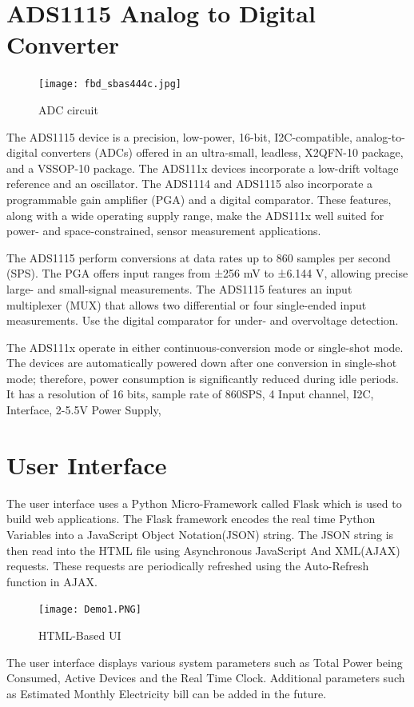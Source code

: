 \section{ADS1115 Analog to Digital Converter}{
\begin{figure}[H]
	\texttt{[image: fbd\_sbas444c.jpg]} %
	\caption{ADC circuit}
	\label{ADC}
\end{figure}
The ADS1115 device is a precision, low-power, 16-bit, I2C-compatible, analog-to-digital converters (ADCs) offered in an ultra-small, leadless, X2QFN-10 package, and a VSSOP-10 package. The ADS111x devices incorporate a low-drift voltage reference and an oscillator. The ADS1114 and ADS1115 also incorporate a programmable gain amplifier (PGA) and a digital comparator. These features, along with a wide operating supply range, make the ADS111x well suited for power- and space-constrained, sensor measurement applications.

The ADS1115 perform conversions at data rates up to 860 samples per second (SPS). The PGA offers input ranges from ±256 mV to ±6.144 V, allowing precise large- and small-signal measurements. The ADS1115 features an input multiplexer (MUX) that allows two differential or four single-ended input measurements. Use the digital comparator for under- and overvoltage detection.

The ADS111x operate in either continuous-conversion mode or single-shot mode. The devices are automatically powered down after one conversion in single-shot mode; therefore, power consumption is significantly reduced during idle periods. It has a resolution of 16 bits, sample rate of 860SPS, 4 Input channel, I2C, Interface, 2-5.5V Power Supply,

}
\section{User Interface}
{The user interface uses a Python Micro-Framework called Flask which is used to build web applications. The Flask framework encodes the real time Python Variables into a JavaScript Object Notation(JSON) string. The JSON string is then read into the HTML file using Asynchronous JavaScript And XML(AJAX) requests. These requests are periodically refreshed using the Auto-Refresh function in AJAX.}
\begin{figure}[H]
	\texttt{[image: Demo1.PNG]} %
	\caption{HTML-Based UI}
	\label{UI}
\end{figure}
{The user interface displays various system parameters such as Total Power being Consumed, Active Devices and the Real Time Clock. Additional parameters such as Estimated Monthly Electricity bill can be added in the future.}

